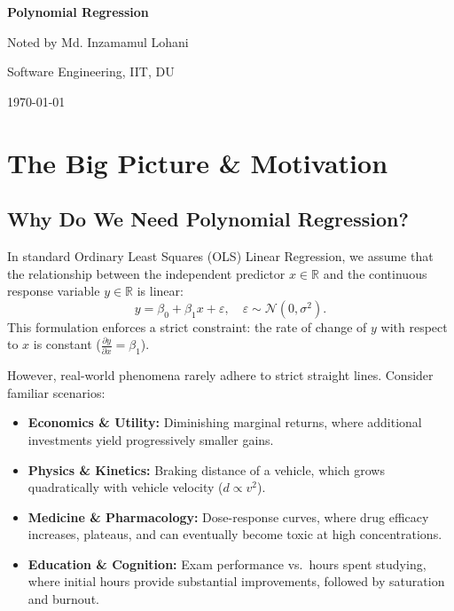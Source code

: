 \documentclass[11pt,a4paper]{article}
\numberwithin{equation}{section}
\newcommand{\topicname}{Polynomial Regression}
\newcommand{\RR}{\mathbb{R}}
\begin{document}
\begin{titlepage}
  \centering
  \vspace*{\fill}
  {\Huge\bfseries \topicname\par}
  \vspace{2.5em}
  {\large Noted by Md. Inzamamul Lohani\par}
  \vspace{0.4em}
  {\large Software Engineering, IIT, DU\par}
  \vspace{2em}
  {\large \today\par}
  \vspace*{\fill}
\end{titlepage}

\setcounter{page}{2}
\begingroup
\enlargethispage{1.0cm}
\setlength{\parskip}{0pt}
\tableofcontents
\endgroup
\newpage

\section{The Big Picture \& Motivation}

\subsection{Why Do We Need Polynomial Regression?}
In standard Ordinary Least Squares (OLS) Linear Regression, we assume that the relationship between the independent predictor $x \in \RR$ and the continuous response variable $y \in \RR$ is linear:
\begin{equation}
  y = \beta_0 + \beta_1 x + \varepsilon, \quad \varepsilon \sim \mathcal{N}(0, \sigma^2).
\end{equation}
This formulation enforces a strict constraint: the rate of change of $y$ with respect to $x$ is constant ($\frac{\partial y}{\partial x} = \beta_1$). 

However, real-world phenomena rarely adhere to strict straight lines. Consider familiar scenarios:
\begin{itemize}
  \item \textbf{Economics \& Utility:} Diminishing marginal returns, where additional investments yield progressively smaller gains.
  \item \textbf{Physics \& Kinetics:} Braking distance of a vehicle, which grows quadratically with vehicle velocity ($d \propto v^2$).
  \item \textbf{Medicine \& Pharmacology:} Dose-response curves, where drug efficacy increases, plateaus, and can eventually become toxic at high concentrations.
  \item \textbf{Education \& Cognition:} Exam performance vs.\ hours spent studying, where initial hours provide substantial improvements, followed by saturation and burnout.
\end{itemize}
\end{document}
